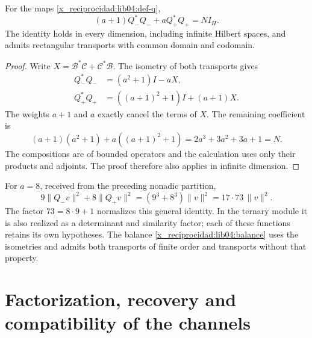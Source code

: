 \begin{theorem}
\label{x_reciprocidad:lib04:teo-balance}
For the maps \eqref{x_reciprocidad:lib04:def-q},
\begin{equation}
 (a+1)Q_-^*Q_-+aQ_+^*Q_+=NI_H.
 \label{x_reciprocidad:lib04:balance}
\end{equation}
The identity holds in every dimension, including infinite Hilbert
spaces, and admits rectangular transports with common domain and
codomain.
\end{theorem}

\begin{proof}
Write \(X=\mathcal B^*\mathcal C+\mathcal C^*\mathcal B\).
The isometry of both transports gives
\begin{align*}
 Q_-^*Q_-&=(a^2+1)I-aX,\\
 Q_+^*Q_+&=((a+1)^2+1)I+(a+1)X.
\end{align*}
The weights \(a+1\) and \(a\) exactly cancel the terms
of \(X\). The remaining coefficient is
\[
 (a+1)(a^2+1)+a((a+1)^2+1)
 =2a^3+3a^2+3a+1=N.
\]
The compositions are of bounded operators and the calculation uses
only their products and adjoints. The proof therefore also applies
in infinite dimension.
\end{proof}

For \(a=8\), received from the preceding nonadic partition,
\begin{equation}
 9\|Q_-v\|^2+8\|Q_+v\|^2
 =(9^3+8^3)\|v\|^2=17\cdot73\,\|v\|^2.
 \label{x_reciprocidad:lib04:balance-canonico}
\end{equation}
The factor \(73=8\cdot9+1\) normalizes this general identity. In the
ternary module it is also realized as a determinant and similarity
factor; each of these functions retains its own hypotheses.
The balance \eqref{x_reciprocidad:lib04:balance} uses the isometries and admits both
transports of finite order and transports without that property.

\section{Factorization, recovery and compatibility of the channels}
\label{x_reciprocidad:lib04:factorizacion}

